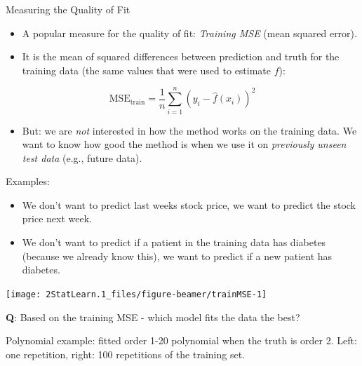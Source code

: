 \documentclass[ignorenonframetext,]{beamer}
\providecommand{\tightlist}{%
  \setlength{\itemsep}{0pt}\setlength{\parskip}{0pt}}
\begin{document}
\begin{frame}

\begin{block}{Measuring the Quality of Fit}

\begin{itemize}
\item
  A popular measure for the quality of fit: \emph{Training MSE} (mean
  squared error).
\item
  It is the mean of squared differences between prediction and truth for
  the training data (the same values that were used to estimate \(f\)):
\end{itemize}

\[ \text{MSE}_{\text{train}}=\frac{1}{n}\sum_{i=1}^n (y_i-\hat{f}(x_i))^2\]

\begin{itemize}
\tightlist
\item
  But: we are \emph{not} interested in how the method works on the
  training data. We want to know how good the method is when we use it
  on \emph{previously unseen test data} (e.g., future data).
\end{itemize}

\end{block}

\end{frame}

\begin{frame}

Examples:

\begin{itemize}
\item
  We don't want to predict last weeks stock price, we want to predict
  the stock price next week.
\item
  We don't want to predict if a patient in the training data has
  diabetes (because we already know this), we want to predict if a new
  patient has diabetes.
\end{itemize}

\end{frame}

\begin{frame}

\begin{center}\texttt{[image: 2StatLearn.1\_files/figure-beamer/trainMSE-1]} \end{center}

\textbf{Q}: Based on the training MSE - which model fits the data the
best?

Polynomial example: fitted order 1-20 polynomial when the truth is order
2. Left: one repetition, right: 100 repetitions of the training set.

\end{frame}
\end{document}
